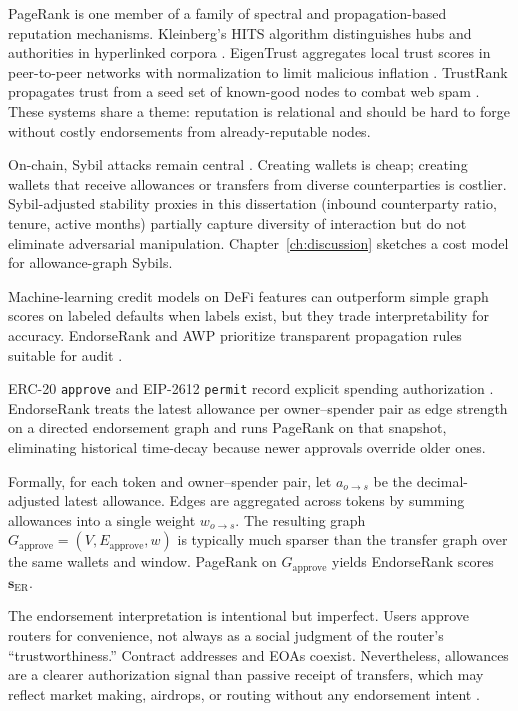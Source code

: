 
PageRank is one member of a family of spectral and propagation-based reputation mechanisms. Kleinberg's HITS algorithm distinguishes hubs and authorities in hyperlinked corpora . EigenTrust aggregates local trust scores in peer-to-peer networks with normalization to limit malicious inflation . TrustRank propagates trust from a seed set of known-good nodes to combat web spam . These systems share a theme: reputation is relational and should be hard to forge without costly endorsements from already-reputable nodes.

On-chain, Sybil attacks remain central . Creating wallets is cheap; creating wallets that receive allowances or transfers from diverse counterparties is costlier. Sybil-adjusted stability proxies in this dissertation (inbound counterparty ratio, tenure, active months) partially capture diversity of interaction but do not eliminate adversarial manipulation. Chapter~\ref{ch:discussion} sketches a cost model for allowance-graph Sybils.

Machine-learning credit models on DeFi features  can outperform simple graph scores on labeled defaults when labels exist, but they trade interpretability for accuracy. EndorseRank and AWP prioritize transparent propagation rules suitable for audit .


ERC-20 \texttt{approve} and EIP-2612 \texttt{permit} record explicit spending authorization . EndorseRank treats the latest allowance per owner--spender pair as edge strength on a directed endorsement graph and runs PageRank on that snapshot, eliminating historical time-decay because newer approvals override older ones.

Formally, for each token and owner--spender pair, let $a_{o\to s}$ be the decimal-adjusted latest allowance. Edges are aggregated across tokens by summing allowances into a single weight $w_{o\to s}$. The resulting graph $G_{\text{approve}}=(V,E_{\text{approve}},w)$ is typically much sparser than the transfer graph over the same wallets and window. PageRank on $G_{\text{approve}}$ yields EndorseRank scores $\mathbf{s}_{\mathrm{ER}}$.

The endorsement interpretation is intentional but imperfect. Users approve routers for convenience, not always as a social judgment of the router's ``trustworthiness.'' Contract addresses and EOAs coexist. Nevertheless, allowances are a clearer authorization signal than passive receipt of transfers, which may reflect market making, airdrops, or routing without any endorsement intent .

